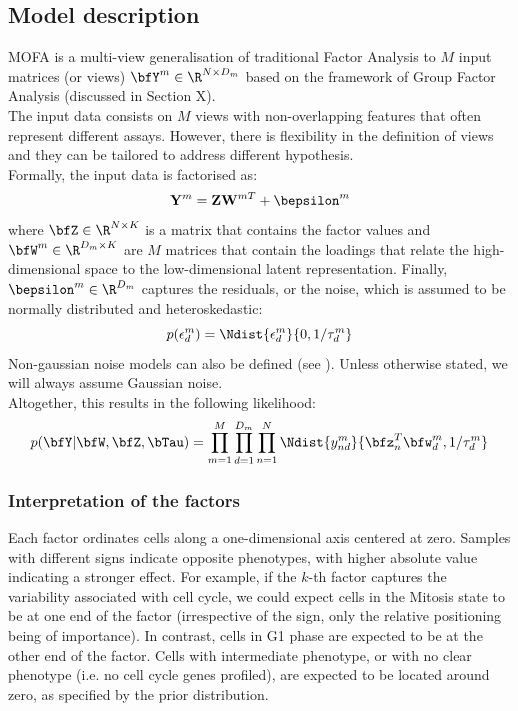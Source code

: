 \subsection{Model description} \label{mofa:model_description}
MOFA is a multi-view generalisation of traditional Factor Analysis to $M$ input matrices (or views) $\bfY^m \in \R^{N \times D_m}$ based on the framework of Group Factor Analysis (discussed in Section X).\\
The input data consists on $M$ views with non-overlapping features that often represent different assays. However, there is flexibility in the definition of views and they can be tailored to address different hypothesis.\\
Formally, the input data is factorised as:
\begin{equation}
	\mathbf{Y}^m = \mathbf{Z}\mathbf{W}^{mT} + \bepsilon^m
\end{equation}
where $\bfZ \in \R^{N \times K}$ is a matrix that contains the factor values and $\bfW^m \in \R^{D_m \times K}$ are $M$ matrices that contain the loadings that relate the high-dimensional space to the low-dimensional latent representation. Finally, $\bepsilon^m \in \R^{D_m}$ captures the residuals, or the noise, which is assumed to be normally distributed and heteroskedastic:
\begin{equation}
	p(\epsilon^m_d) = \Ndist{\epsilon^m_d}{0,1/\tau_d^m}
\end{equation}
Non-gaussian noise models can also be defined (see ). Unless otherwise stated, we will always assume Gaussian noise.\\
Altogether, this results in the following likelihood:
\begin{equation}
	p(\bfY|\bfW,\bfZ,\bTau) = \prod_{m=1}^{M} \prod_{d=1}^{D_m} \prod_{n=1}^{N} \Ndist{y_{nd}^m}{\bfz_{n}^T\bfw_{d}^{m},1/\tau_d^m}
\end{equation}

\subsubsection{Interpretation of the factors}
Each factor ordinates cells along a one-dimensional axis centered at zero. Samples with different signs indicate opposite phenotypes, with higher absolute value indicating a stronger effect. For example, if the $k$-th factor captures the variability associated with cell cycle, we could expect cells in the Mitosis state to be at one end of the factor (irrespective of the sign, only the relative positioning being of importance). In contrast, cells in G1 phase are expected to be at the other end of the factor. Cells with intermediate phenotype, or with no clear phenotype (i.e. no cell cycle genes profiled), are expected to be located around zero, as specified by the prior distribution.

